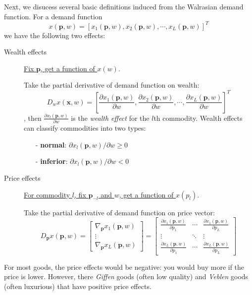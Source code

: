 Next, we disucess several basic definitions induced from the Walrasian demand function. For a demand function 
$$ x(\mathbf{p},w)=\left[x_1 (\mathbf{p},w),x_2 (\mathbf{p},w),\cdots, x_L(\mathbf{p},w) \right]^T$$ we have the following two effects:

\begin{description}
    \item[Wealth effects] \underline{Fix $\mathbf{p}$, get a function of $x(w)$}.
    
    Take the partial derivative of demand function on wealth: $$D_w x(\mathbf{x},w)=\left[\frac{\partial x_1(\mathbf{p},w)}{\partial w}, \frac{\partial x_2(\mathbf{p},w)}{\partial w},\cdots, \frac{\partial x_L(\mathbf{p},w)}{\partial w} \right]^T$$, then $\frac{\partial x_l(\mathbf{p},w)}{\partial w}$ is the \textit{wealth effect} for the $l$th commodity.
    Wealth effects can classify commodities into two types:
    \begin{enumerate}
        \item[-] \textbf{normal}: $\partial x_l(\mathbf{p},w)/\partial w\geq 0$
        \item[-] \textbf{inferior}: $\partial x_l(\mathbf{p},w)/\partial w <0$
    \end{enumerate} 
    \item[Price effects] \underline{For commodity $l$, fix $\mathbf{p}_{-l}$ and $w$, get a function of $x(p_l)$}.
    
    Take the partial derivative of demand function on price vector:
    $$D_{\mathbf{p}}x(\mathbf{p},w)= \begin{bmatrix}
        \nabla_{\mathbf{p}}x_1(\mathbf{p},w)\\
        \vdots\\
        \nabla_{\mathbf{p}}x_L(\mathbf{p},w) \end{bmatrix} 
    =
    \begin{bmatrix}
        \frac{\partial x_1(\mathbf{p},w)}{\partial p_1} & \cdots & \frac{\partial x_1(\mathbf{p},w)}{\partial p_L}\\
        \vdots & \ddots & \vdots\\
        \frac{\partial x_L(\mathbf{p},w)}{\partial p_1} & \cdots &\frac{\partial x_L(\mathbf{p},w)}{\partial p_L}
        \end{bmatrix}$$
\end{description}

For most goods, the price effects would be negative: you would buy more if the price is lower. However, there \textit{Giffen} goods (often low quality) and \textit{Veblen} goods (often luxurious) that have positive price effects.

